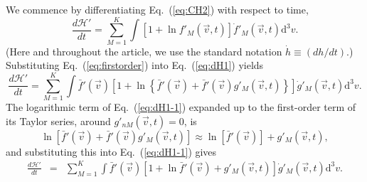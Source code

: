 We commence by differentiating Eq.~(\ref{eq:CH2}) with respect to time,
%
\begin{equation}\label{eq:dH1}
    \frac{d\mathcal{H}'}{dt}=\sum_{M=1}^{K}\int\left[
      1+\ln f'_M(\vec{v},t)
    \right]\dot f'_M(\vec{v},t)\mathrm{d}^3v.
\end{equation}
%
(Here and throughout the article, we use the standard notation $\dot h\equiv(dh/dt)$.)
Substituting Eq.~(\ref{eq:firstorder}) into Eq.~(\ref{eq:dH1}) yields
%
\begin{equation}\label{eq:dH1-1}
    \frac{d\mathcal{H}'}{dt}=\sum_{M=1}^{K}\int\bar f'(\vec{v}) \left[
      1+\ln \left\{
        \bar f'(\vec{v})+\bar f'(\vec{v})g'_M(\vec{v},t)
      \right\}
    \right]\dot g'_M(\vec{v},t)\mathrm{d}^3v.
\end{equation}
%
The logarithmic term of Eq.~(\ref{eq:dH1-1}) expanded up to the first-order term
of its Taylor series, around $g'_{nM}(\vec{v},t)=0$, is
%
\begin{equation}\label{lnapproximationclassical}
    \ln [\bar{f}'(\vec{v})+\bar{f}'(\vec{v}) g'_{M}(\vec{v},t)] \approx
    \ln [\bar{f}'(\vec{v})]+ g'_{M}(\vec{v},t),
\end{equation}
%
and substituting this into Eq.~(\ref{eq:dH1-1}) gives
%
\begin{eqnarray}
    \frac{d\mathcal{H}'}{dt}&=&\sum_{M=1}^{K} \int \bar f'(\vec{v})\left[
      1+\ln \bar f'(\vec{v})+g'_M(\vec{v},t)
    \right]\dot g'_M(\vec{v},t)\mathrm{d}^3v.
\end{eqnarray}
%


